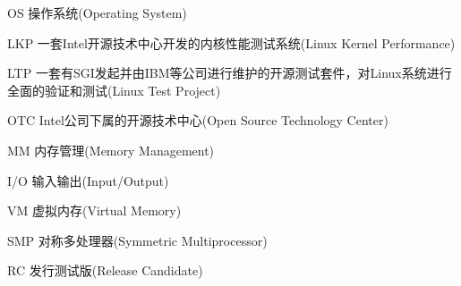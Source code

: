 
\begin{denotation}

\item[OS] 操作系统(Operating System)
\item[LKP] 一套Intel开源技术中心开发的内核性能测试系统(Linux Kernel Performance)
\item[LTP] 一套有SGI发起并由IBM等公司进行维护的开源测试套件，对Linux系统进行全面的验证和测试(Linux Test Project)
\item[OTC] Intel公司下属的开源技术中心(Open Source Technology Center)
\item[MM] 内存管理(Memory Management)
\item[I/O] 输入输出(Input/Output)
\item[VM] 虚拟内存(Virtual Memory)
\item[SMP] 对称多处理器(Symmetric Multiprocessor)
\item[RC] 发行测试版(Release Candidate)


\end{denotation}